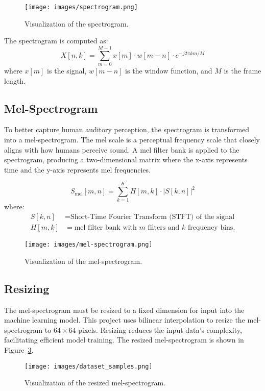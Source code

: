 \begin{figure}[h]
    \centering
    \texttt{[image: images/spectrogram.png]}
    \caption{Visualization of the spectrogram.}
    \label{fig:spectrogram}
\end{figure}

The spectrogram is computed as:
\[
X[n, k] = \sum_{m=0}^{M-1} x[m] \cdot w[m-n] \cdot e^{-j2\pi km/M}
\]
where \(x[m]\) is the signal, \(w[m-n]\) is the window function, and \(M\) is the frame length.

\subsection{Mel-Spectrogram}
To better capture human auditory perception, the spectrogram is transformed into a mel-spectrogram. The mel scale is a perceptual frequency scale that closely aligns with how humans perceive sound. A mel filter bank is applied to the spectrogram, producing a two-dimensional matrix where the x-axis represents time and the y-axis represents mel frequencies.

\[
S_{\text{mel}}[m, n] = \sum_{k=1}^{K} H[m, k] \cdot |S[k, n]|^2
\]
where:
\begin{align*}
S[k, n] & = \text{Short-Time Fourier Transform (STFT) of the signal} \\
H[m, k] & = \text{mel filter bank with } m \text{ filters and } k \text{ frequency bins.}
\end{align*}

\begin{figure}[h]
    \centering
    \texttt{[image: images/mel-spectrogram.png]}
    \caption{Visualization of the mel-spectrogram.}
    \label{fig:mel-spectrogram}
\end{figure}

\subsection{Resizing}
The mel-spectrogram must be resized to a fixed dimension for input into the machine learning model. This project uses bilinear interpolation to resize the mel-spectrogram to \(64 \times 64\) pixels. Resizing reduces the input data's complexity, facilitating efficient model training. The resized mel-spectrogram is shown in Figure~\ref{fig:resized-mel-spectrogram}.

\begin{figure}[h]
    \centering
    \texttt{[image: images/dataset\_samples.png]}
    \caption{Visualization of the resized mel-spectrogram.}
    \label{fig:resized-mel-spectrogram}
\end{figure}
